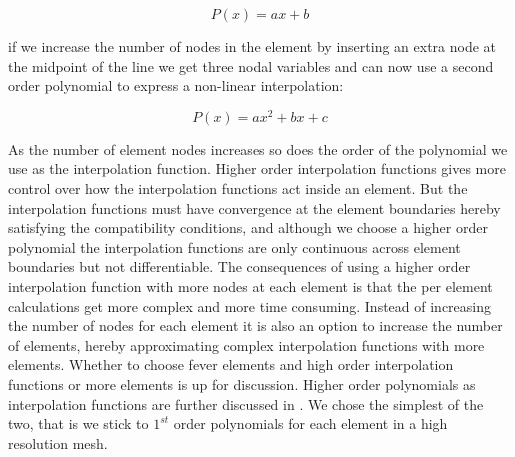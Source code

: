 \begin{equation*}
P(x) = ax + b
\end{equation*}

if we increase the number of nodes in the element by inserting an
extra node at the midpoint of the line we get three nodal variables
and can now use a second order polynomial to express a non-linear
interpolation: 

\begin{equation*}
P(x) = ax^2 +bx + c
\end{equation*}

As the number of element nodes increases so does the order of the
polynomial we use as the interpolation
function. Higher order interpolation functions gives more control over
how the interpolation functions act inside an element. But the
interpolation functions must have convergence at the element
boundaries hereby satisfying the compatibility conditions, and
although we choose a higher order polynomial the interpolation
functions are only continuous across element boundaries but not
differentiable.
%
The consequences of using a higher order interpolation function with
more nodes at each element is that the per element calculations get
more complex and more time consuming. Instead of increasing the
number of nodes for each element it is also an option to increase
the number of elements, hereby approximating complex
interpolation functions with more elements. Whether to choose fever
elements and high order interpolation functions or more elements
is up for discussion. Higher order polynomials as
interpolation functions are further discussed in
.
We chose the simplest of the two, that is we stick to
$1^{st}$ order polynomials for each element in a high resolution mesh.\\


